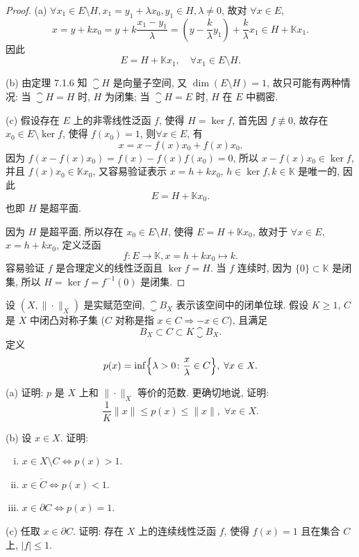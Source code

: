 \begin{proof}
    (a) $\forall x_1\in E\setminus H,x_1=y_1+\lambda x_0,y_1\in H,\lambda\neq0$, 故对 $\forall x\in E$,
    \[x=y+kx_0=y+k\frac{x_1-y_1}{\lambda}=\left(y-\frac{k}{\lambda}y_1\right)+\frac{k}{\lambda}x_1\in H+\mathbb{K}x_1.\]
    因此
    \[E=H+\mathbb{K}x_1,\quad\forall x_1\in E\setminus H.\]

    (b) 由定理 7.1.6 知 $\closure{H}$ 是向量子空间, 又 $\dim (E\setminus H)=1$, 故只可能有两种情况:
    当 $\closure{H}=H$ 时, $H$ 为闭集; 当 $\closure{H}=E$ 时, $H$ 在 $E$ 中稠密.

    (c) \sufficient
    假设存在 $E$ 上的非零线性泛函 $f$, 使得 $H=\ker f$, 首先因 $f\not\equiv 0$,
    故存在 $x_0\in E\setminus\ker f$, 使得 $f(x_0)=1$, 则$\forall x\in E$, 有
    \[x=x-f(x)x_0+f(x)x_0.\]
    因为 $f(x-f(x)x_0)=f(x)-f(x)f(x_0)=0$, 所以 $x-f(x)x_0\in\ker f$,
    并且 $f(x)x_0\in\mathbb{K}x_0$, 又容易验证表示 $x=h+kx_0$, $h\in\ker f,k\in\mathbb{K}$ 是唯一的, 因此
    \[E=H+\mathbb{K}x_0.\]
    也即 $H$ 是超平面.

    \necessary
    因为 $H$ 是超平面, 所以存在 $x_0\in E\setminus H$, 使得 $E=H+\mathbb{K}x_0$, 
    故对于 $\forall x\in E$, $x=h+kx_0$, 定义泛函
    \[f:E\to\mathbb{K},x=h+kx_0\mapsto k.\]
    容易验证 $f$ 是合理定义的线性泛函且 $\ker f=H$.
    当 $f$ 连续时, 因为 $\{0\}\subset\mathbb{K}$ 是闭集, 所以 $H=\ker f=f^{-1}(0)$ 是闭集.
\end{proof}



\begin{exercise}
    设 $(X,\|\cdot\|_X)$ 是实赋范空间, $\closure{B}_X$ 表示该空间中的闭单位球.
    假设 $K\geq 1$, $C$ 是 $X$ 中闭凸对称子集 ($C$ 对称是指 $x\in C\Rightarrow -x\in C$), 且满足
    \[B_X\subset C\subset K\closure{B}_X.\]
    定义
    \[p(x)=\inf\Bigl\{\lambda>0\colon\frac{x}{\lambda}\in C\Bigr\},\;\forall x\in X.\]

    (a) 证明: $p$ 是 $X$ 上和 $\|\cdot\|_X$ 等价的范数. 更确切地说, 证明:
    \[\frac{1}{K}\|x\|\leq p(x)\leq\|x\|,\;\forall x\in X.\]

    (b) 设 $x\in X$. 证明:
    \begin{enumerate}[(i)]
        \item $x\in X\setminus C\Longleftrightarrow p(x)>1$.
        \item $x\in\mathring{C}\Longleftrightarrow p(x)<1$.
        \item $x\in\partial C\Longleftrightarrow p(x)=1$.
    \end{enumerate}

    (c) 任取 $x\in\partial C$. 证明: 存在 $X$ 上的连续线性泛函 $f$, 使得 $f(x)=1$ 且在集合 $C$ 上, $|f|\leq 1$.
\end{exercise}

